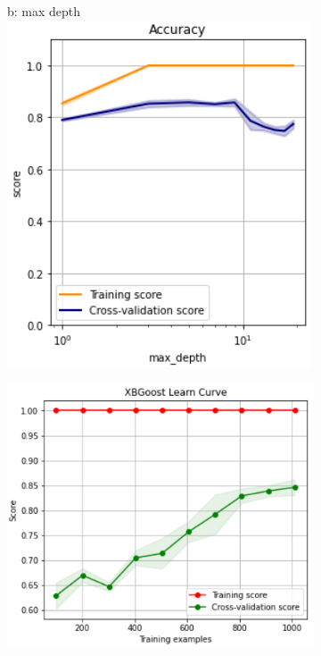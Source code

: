\documentclass{article}
\begin{document}
\begin{figure}
\begin{subfigure}{.30\textwidth}
	\end{subfigure}
	\begin{subfigure}{.30\textwidth}
		\centering
		b: max depth\\
		\includegraphics[width=\linewidth]{poland_xgb_max_depth_accuracy.png}
		
	\end{subfigure}
	\begin{subfigure}{0.38\textwidth}
		\centering
		\includegraphics[width=\linewidth]{poland_xgb_learning_curve.png}
		
	\end{subfigure}
	\label{fig:test}
\end{figure}
\end{document}
